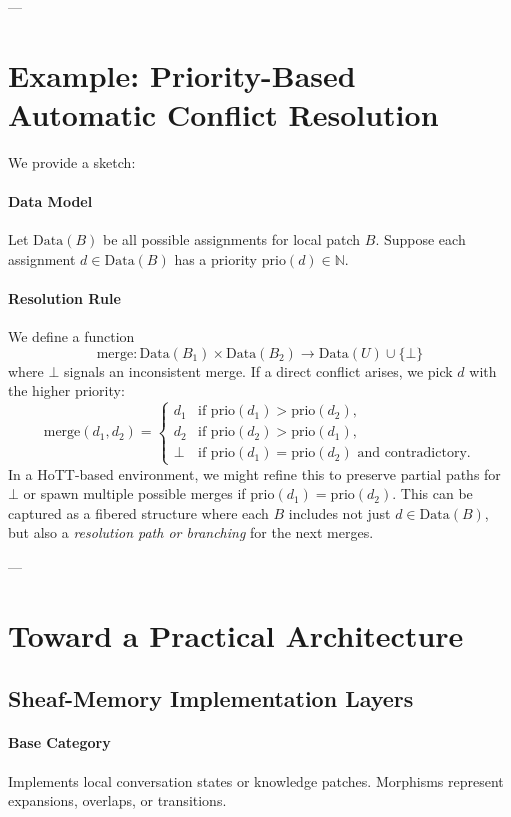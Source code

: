 \documentclass{article}
\begin{document}
---

\section{Example: Priority-Based Automatic Conflict Resolution}

We provide a sketch:

\paragraph{Data Model}  
Let $\mathrm{Data}(B)$ be all possible assignments for local patch $B$. Suppose each assignment $d \in \mathrm{Data}(B)$ has a priority $\mathrm{prio}(d) \in \mathbb{N}$.  

\paragraph{Resolution Rule}  
We define a function
\[
\mathrm{merge}: \mathrm{Data}(B_1) \times \mathrm{Data}(B_2) \to \mathrm{Data}(U) \cup \{\bot\}
\]
where $\bot$ signals an inconsistent merge. If a direct conflict arises, we pick $d$ with the higher priority:
\[
\mathrm{merge}(d_1, d_2) = 
\begin{cases}
d_1 & \text{if } \mathrm{prio}(d_1) > \mathrm{prio}(d_2), \\
d_2 & \text{if } \mathrm{prio}(d_2) > \mathrm{prio}(d_1), \\
\bot & \text{if } \mathrm{prio}(d_1) = \mathrm{prio}(d_2) \text{ and contradictory.}
\end{cases}
\]
In a HoTT-based environment, we might refine this to preserve partial paths for $\bot$ or spawn multiple possible merges if $\mathrm{prio}(d_1) = \mathrm{prio}(d_2)$. This can be captured as a fibered structure where each $B$ includes not just $d \in \mathrm{Data}(B)$, but also a \emph{resolution path or branching} for the next merges.

---

\section{Toward a Practical Architecture}
\label{sec:practical}

\subsection{Sheaf-Memory Implementation Layers}

\paragraph{Base Category}  
Implements local conversation states or knowledge patches. Morphisms represent expansions, overlaps, or transitions.
\end{document}
